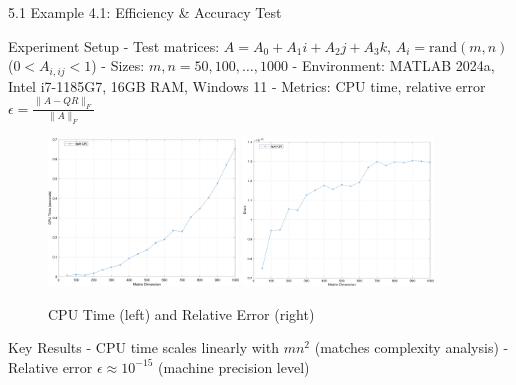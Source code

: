 \documentclass{beamer}
\begin{document}
\begin{frame}{5.1 Example 4.1: Efficiency \& Accuracy Test}
  \begin{block}{Experiment Setup}
    - Test matrices: $A = A_0 + A_1i + A_2j + A_3k$, $A_i = \text{rand}(m,n)$ ($0 < A_{i,ij} < 1$)
    - Sizes: $m,n = 50,100,\dots,1000$
    - Environment: MATLAB 2024a, Intel i7-1185G7, 16GB RAM, Windows 11
    - Metrics: CPU time, relative error $\epsilon = \frac{\|A - QR\|_F}{\|A\|_F}$
  \end{block}
  
  \begin{figure}[h]
    \centering
    \includegraphics[width=0.45\textwidth]{images/Figure_2.png} %
    \includegraphics[width=0.45\textwidth]{images/Figure_3.png} %
    \caption{CPU Time (left) and Relative Error (right)}
  \end{figure}
  
  \begin{block}{Key Results}
    - CPU time scales linearly with $mn^2$ (matches complexity analysis)
    - Relative error $\epsilon \approx 10^{-15}$ (machine precision level)
  \end{block}
\end{frame}
\end{document}
